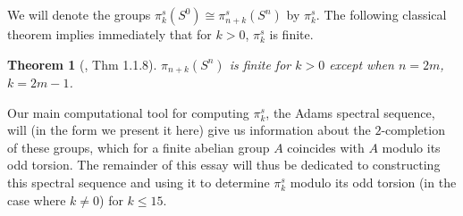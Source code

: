 \documentclass[11pt, titlepage]{article} %
\def\inte{\ensuremath\mathbb{Z}}
\DeclareMathOperator{\Hom}{Hom}
\numberwithin{equation}{subsection}
\theoremstyle{plain}
\newtheorem{theorem}{Theorem}[subsection]
\theoremstyle{definition}
\begin{document}
We will denote the groups \(\pi_k^s(S^0)\cong \pi^s_{n+k}(S^n)\) by \(\pi_k^s\). The following classical theorem implies immediately that for \(k>0\), \(\pi_k^s\) is finite.


\begin{theorem}[{\autocite{cobordism}, Thm 1.1.8}]
\(\pi_{n+k}(S^n)\) is finite for \(k>0\) except when \(n=2m\), \(k=2m-1\). 
\end{theorem}

Our main computational tool for computing \(\pi_k^s\), the Adams spectral sequence, will (in the form we present it here) give us information about the \(2\)-completion of these groups, which for a finite abelian group \(A\) coincides with \(A\) modulo its odd torsion. The remainder of this essay will thus be dedicated to constructing this spectral sequence and using it to determine \(\pi_k^s\) modulo its odd torsion (in the case where \(k\neq 0\)) for \(k \leq 15\). 

\end{document}

